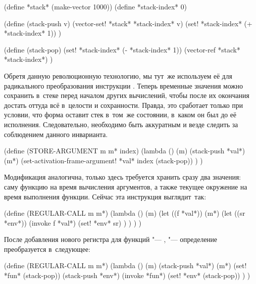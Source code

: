 \begin{code:lisp}
(define *stack* (make-vector 1000))
(define *stack-index* 0)

(define (stack-push v)
  (vector-set! *stack* *stack-index* v)
  (set! *stack-index* (+ *stack-index* 1)) )

(define (stack-pop)
  (set! *stack-index* (- *stack-index* 1))
  (vector-ref *stack* *stack-index*) )
\end{code:lisp}

Обретя данную революционную технологию, мы тут~же используем её для радикального
преобразования инструкции . Теперь временные значения можно
сохранить в~стеке перед началом других вычислений, чтобы после их окончания
достать оттуда всё в~целости и сохранности. Правда, это сработает только при
условии, что форма  оставит стек в~том~же состоянии, в~каком он был до
её исполнения. Следовательно, необходимо быть аккуратным и везде следить за
соблюдением данного инварианта.

\begin{code:lisp}
(define (STORE-ARGUMENT m m* index)
  (lambda ()
    (m)
    (stack-push *val*)
    (m*)
    (set-activation-frame-argument! *val* index (stack-pop)) ) )
\end{code:lisp}

Модификация  аналогична, только здесь требуется хранить сразу
два значения: саму функцию на время вычисления аргументов, а также текущее
окружение на время выполнения функции. Сейчас эта инструкция выглядит~так:

\begin{code:lisp}
(define (REGULAR-CALL m m*)
  (lambda ()
    (m)
    (let ((f *val*))
      (m*)
      (let ((sr *env*))
        (invoke f *val*)
        (set! *env* sr) ) ) ) )
\end{code:lisp}

После добавления нового регистра для функций "--- , "--- определение
преобразуется в~следующее:

\begin{code:lisp}
(define (REGULAR-CALL m m*)
  (lambda ()
    (m)
    (stack-push *val*)
    (m*)
    (set! *fun* (stack-pop))
    (stack-push *env*)
    (invoke *fun*)
    (set! *env* (stack-pop)) ) )
\end{code:lisp}

